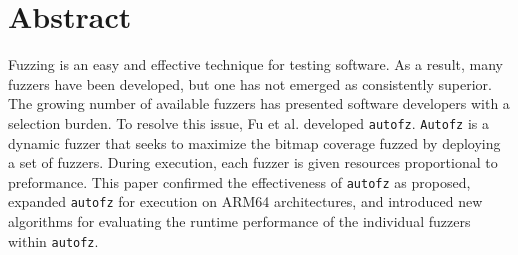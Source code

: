 \section{Abstract}
Fuzzing is an easy and effective technique for testing software. As a result, 
many fuzzers have been developed, but one has not emerged as consistently superior. 
The growing number of available fuzzers has presented software developers with a 
selection burden.  To resolve this issue, Fu et al. developed \texttt{autofz}. 
\texttt{Autofz} is a dynamic fuzzer that seeks to maximize the bitmap coverage fuzzed
by deploying a set of fuzzers. During execution, each fuzzer is given resources 
proportional to preformance. This paper confirmed the effectiveness of \texttt{autofz} 
as proposed, expanded \texttt{autofz} for execution on ARM64 architectures, and introduced new
algorithms for evaluating the runtime performance of the individual fuzzers within 
\texttt{autofz}.
